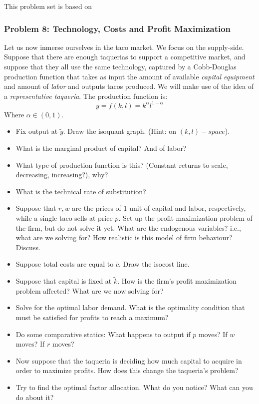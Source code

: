 \documentclass{article}
\begin{document}
This problem set is based on  \cite{Valrian_Inter_Micro}

\subsubsection*{Problem 8: Technology, Costs and Profit Maximization }
Let us now inmerse ourselves in the taco market. We focus on the supply-side.
Suppose that there are enough taquerias to support a competitive market,
and suppose that they all use the same technology, captured by a
Cobb-Douglas production function that takes as input the amount of
available \textit{capital equipment } and amount of \textit{labor }
and outputs tacos produced.
We will make use of the idea of a \textit{representative taqueria}.
The production function is:
\begin{equation*}
  y = f(k,l) = k^{\alpha}l^{1-\alpha}
\end{equation*}
Where \(\alpha \in (0,1)\).
\begin{itemize}
  \item Fix output at \(\tilde{y}\). Draw the isoquant graph.
  (Hint: on \((k,l)-space\)).
  \item What is the marginal product of capital? And of labor?
  \item What type of production function is this?
  (Constant returns to scale, decreasing, increasing?), why?
  \item What is the technical rate of substitution?
  \item Suppose that \(r, w\) are the prices of 1 unit of capital and labor,
  respectively, while a single taco sells at price \(p\).
  Set up the profit maximization problem of the firm, but do not solve it yet.
  What are the endogenous variables? i.e., what are we solving for?
  How realistic is this model of firm behaviour? Discuss.
  \item Suppose total costs are equal to \(\bar{c}\). Draw the isocost line.
  \item Suppose that capital is fixed at \(\tilde{k}\). How is the firm's profit
  maximization problem affected? What are we now solving for?
  \item Solve for the optimal labor demand. What is the optimality condition that
  must be satisfied for profits to reach a maximum?
  \item Do some comparative statics: What happens to output
  if \(p\) moves? If \(w\) moves? If \(r\) moves?
  \item Now suppose that the taqueria is deciding how much capital to acquire in
  order to maximize profits. How does this change the taqueria's problem?
  \item Try to find the optimal factor allocation. What do you notice? What can
  you do about it?
\end{itemize}
\newpage

\printbibliography
\end{document}
